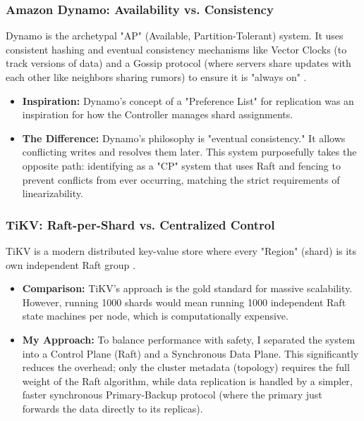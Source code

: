 \documentclass[shortabstract]{iithesis}
\begin{document}
\subsubsection{Amazon Dynamo: Availability vs. Consistency}
Dynamo is the archetypal "AP" (Available, Partition-Tolerant) system. It uses consistent hashing and eventual consistency mechanisms like Vector Clocks (to track versions of data) and a Gossip protocol (where servers share updates with each other like neighbors sharing rumors) to ensure it is "always on" \cite{dynamo}.
\begin{itemize}
    \item \textbf{Inspiration:} Dynamo's concept of a "Preference List" for replication was an inspiration for how the Controller manages shard assignments.
    \item \textbf{The Difference:} Dynamo's philosophy is "eventual consistency." It allows conflicting writes and resolves them later. This system purposefully takes the opposite path: identifying as a "CP" system that uses Raft and fencing to prevent conflicts from ever occurring, matching the strict requirements of linearizability.
\end{itemize}

\subsubsection{TiKV: Raft-per-Shard vs. Centralized Control}
TiKV is a modern distributed key-value store where every "Region" (shard) is its own independent Raft group \cite{tikv}.
\begin{itemize}
    \item \textbf{Comparison:} TiKV's approach is the gold standard for massive scalability. However, running 1000 shards would mean running 1000 independent Raft state machines per node, which is computationally expensive.
    \item \textbf{My Approach:} To balance performance with safety, I separated the system into a Control Plane (Raft) and a Synchronous Data Plane. This significantly reduces the overhead; only the cluster metadata (topology) requires the full weight of the Raft algorithm, while data replication is handled by a simpler, faster synchronous Primary-Backup protocol (where the primary just forwards the data directly to its replicas).
\end{itemize}





\end{document}
